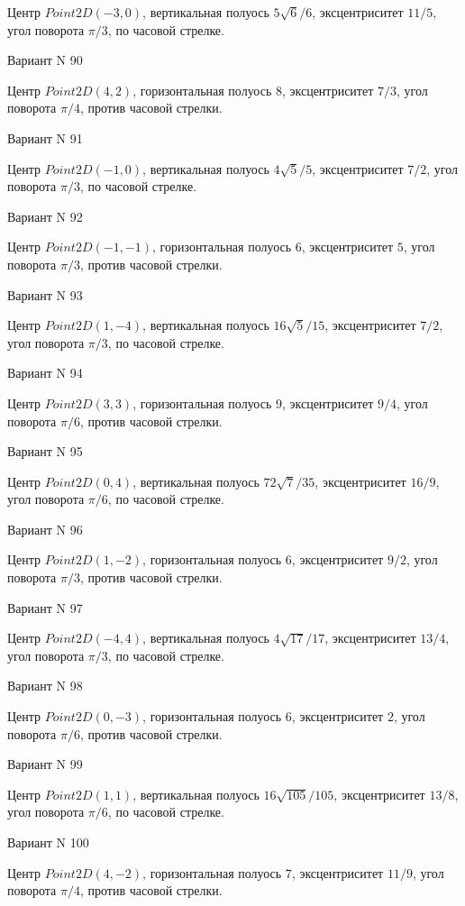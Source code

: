 \documentclass[11pt]{report}
\begin{document}
Центр $Point2D\left(-3, 0\right)$, вертикальная полуось $5 \sqrt{6} / 6$, эксцентриситет $11 / 5$, угол поворота $\pi / 3$, по часовой стрелке.

Вариант N 90

Центр $Point2D\left(4, 2\right)$, горизонтальная полуось $8$, эксцентриситет $7 / 3$, угол поворота $\pi / 4$, против часовой стрелки.

Вариант N 91

Центр $Point2D\left(-1, 0\right)$, вертикальная полуось $4 \sqrt{5} / 5$, эксцентриситет $7 / 2$, угол поворота $\pi / 3$, по часовой стрелке.

Вариант N 92

Центр $Point2D\left(-1, -1\right)$, горизонтальная полуось $6$, эксцентриситет $5$, угол поворота $\pi / 3$, против часовой стрелки.

Вариант N 93

Центр $Point2D\left(1, -4\right)$, вертикальная полуось $16 \sqrt{5} / 15$, эксцентриситет $7 / 2$, угол поворота $\pi / 3$, по часовой стрелке.

Вариант N 94

Центр $Point2D\left(3, 3\right)$, горизонтальная полуось $9$, эксцентриситет $9 / 4$, угол поворота $\pi / 6$, против часовой стрелки.

Вариант N 95

Центр $Point2D\left(0, 4\right)$, вертикальная полуось $72 \sqrt{7} / 35$, эксцентриситет $16 / 9$, угол поворота $\pi / 6$, по часовой стрелке.

Вариант N 96

Центр $Point2D\left(1, -2\right)$, горизонтальная полуось $6$, эксцентриситет $9 / 2$, угол поворота $\pi / 3$, против часовой стрелки.

Вариант N 97

Центр $Point2D\left(-4, 4\right)$, вертикальная полуось $4 \sqrt{17} / 17$, эксцентриситет $13 / 4$, угол поворота $\pi / 3$, по часовой стрелке.

Вариант N 98

Центр $Point2D\left(0, -3\right)$, горизонтальная полуось $6$, эксцентриситет $2$, угол поворота $\pi / 6$, против часовой стрелки.

Вариант N 99

Центр $Point2D\left(1, 1\right)$, вертикальная полуось $16 \sqrt{105} / 105$, эксцентриситет $13 / 8$, угол поворота $\pi / 6$, по часовой стрелке.

Вариант N 100

Центр $Point2D\left(4, -2\right)$, горизонтальная полуось $7$, эксцентриситет $11 / 9$, угол поворота $\pi / 4$, против часовой стрелки.
\end{document}
